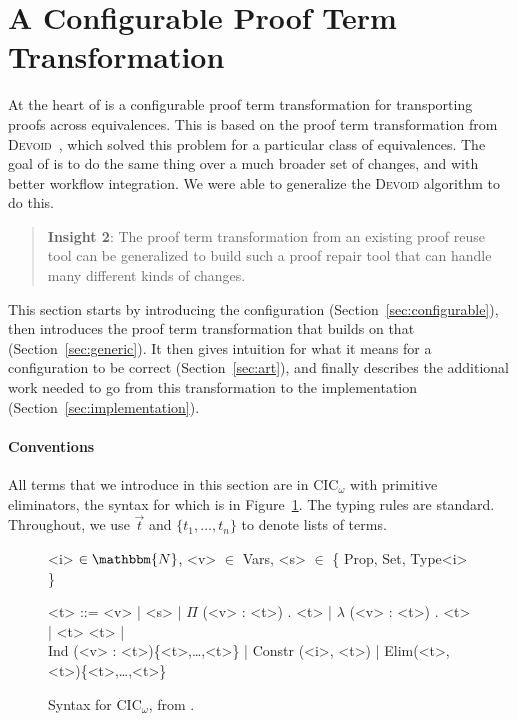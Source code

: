 \section{A Configurable Proof Term Transformation}
\label{sec:key2}

At the heart of \toolname is a configurable proof term transformation for transporting
proofs across equivalences. This is based on the proof term transformation from 
\textsc{Devoid}~\cite{Ringer2019}, which solved this problem for a particular class of equivalences.
The goal of \toolname is to do the same thing over a much broader set of changes, and with better workflow integration.
We were able to generalize the \textsc{Devoid} algorithm to do this.

\begin{quote}
\textbf{Insight 2}:
The proof term transformation from an existing proof reuse tool can be generalized
to build such a proof repair tool that can handle 
many different kinds of changes.
\end{quote}

This section starts by introducing the configuration (Section~\ref{sec:configurable}),
then introduces the proof term transformation that builds on that (Section~\ref{sec:generic}).
It then gives intuition for what it means for a configuration to be correct (Section~\ref{sec:art}),
and finally describes the additional work needed to go from this transformation to the implementation (Section~\ref{sec:implementation}). 

\paragraph{Conventions}
All terms that we introduce in this section are in CIC$_{\omega}$ with primitive eliminators,
the syntax for which is in Figure~\ref{fig:syntax}.
The typing rules are standard.
Throughout, we use $\vec{t}$ and $\{t_1, \ldots, t_n\}$ to denote lists of terms.

\begin{figure}
\small
\begin{grammar}
<i> $\in \mathbbm{N}$, <v> $\in$ Vars, <s> $\in$ \{ Prop, Set, Type<i> \}

<t> ::= <v> | <s> | $\Pi$ (<v> : <t>) . <t> | $\lambda$ (<v> : <t>) . <t> | <t> <t> | \\ 
Ind (<v> : <t>)\{<t>,\ldots,<t>\} | Constr (<i>, <t>) | Elim(<t>, <t>)\{<t>,\ldots,<t>\}
\end{grammar}
\vspace{-0.3cm}
\caption{Syntax for CIC$_\omega$, from \citet{Timany2015FirstST}.}
\label{fig:syntax}
\end{figure}

